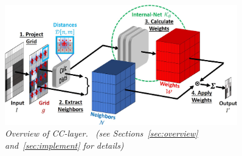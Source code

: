 \begin{figure}[t]
\vspace*{-1cm}
    \centering
    \includegraphics[width=0.9\textwidth]{figs/fig_overview_Ben.jpg}
    \caption{\it Overview of CC-layer. \ (see Sections~\ref{sec:overview} and~\ref{sec:implement} for details)}
    \label{fig:overview}
    \vspace*{-0.3cm}
\end{figure}



